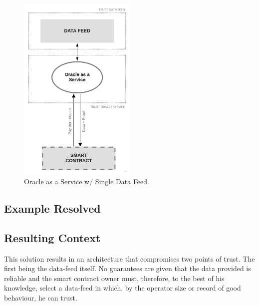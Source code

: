 \begin{figure}[t]
  \begin{center}
    \leavevmode
    \includegraphics[width=0.5\textwidth]{figures/oraclearch1.jpg}
    \caption{Oracle as a Service w/ Single Data Feed.}
    \label{fig:/figures/paper-screening}
  \end{center}
\end{figure}

\subsection{Example Resolved}


\subsection{Resulting Context}

This solution results in an architecture that compromises two points of trust. The first being the data-feed itself. No guarantees are given that the data provided is reliable and the smart contract owner must, therefore, to the best of his knowledge, select a data-feed in which, by the operator size or record of good behaviour, he can trust.

